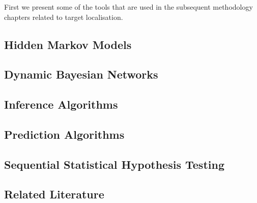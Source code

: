 

First we present some of the tools that are used in the subsequent methodology chapters related to target localisation. 


\subsection{Hidden Markov Models}\label{subsec:BGHMM}


\subsection{Dynamic Bayesian Networks}\label{subsec:BGDBN}


\subsection{Inference Algorithms}\label{subsec:BGInfAlgos}


\subsection{Prediction Algorithms}


\subsection{Sequential Statistical Hypothesis Testing}\label{subsec:SPRT}


\subsection{Related Literature}
